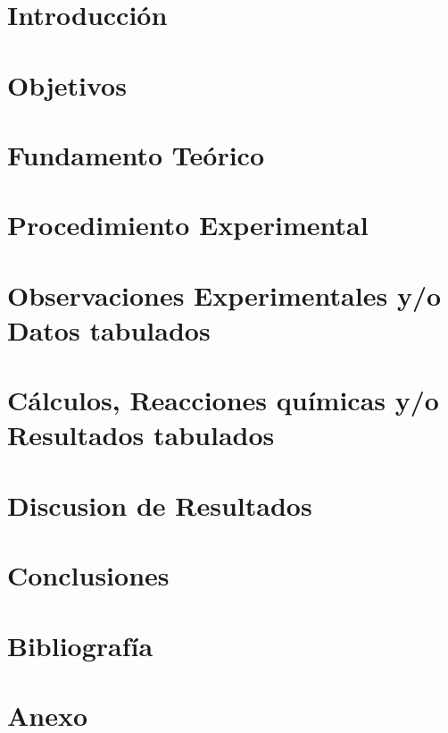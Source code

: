 \documentclass[12pt, a4paper]{article}
\begin{document}


\pagestyle{fancy}
\fancyfoot{} %
\fancyfoot[R]{\thepage}

\tableofcontents
\clearpage

\section{Introducción} %


\section{Objetivos} %


\section{Fundamento Teórico} %


\section{Procedimiento Experimental}


\section{Observaciones Experimentales y/o Datos tabulados} %


\section{Cálculos, Reacciones químicas y/o Resultados tabulados}


\section{Discusion de Resultados}


\section{Conclusiones}


\section{Bibliografía}
\printbibliography

\clearpage

\listoffigures
\listoftables

\clearpage

\section{Anexo}
\end{document}
